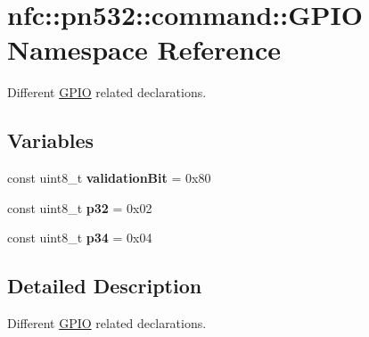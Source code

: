 \hypertarget{namespacenfc_1_1pn532_1_1command_1_1GPIO}{}\section{nfc\+:\+:pn532\+:\+:command\+:\+:G\+P\+IO Namespace Reference}
\label{namespacenfc_1_1pn532_1_1command_1_1GPIO}


Different \hyperlink{namespacenfc_1_1pn532_1_1command_1_1GPIO}{G\+P\+IO} related declarations.  


\subsection*{Variables}
\begin{DoxyCompactItemize}
\item 
\mbox{\label{namespacenfc_1_1pn532_1_1command_1_1GPIO_a6bcb3c35498d6509f17ae9c0a0848d50}} 
const uint8\+\_\+t {\bfseries validation\+Bit} = 0x80
\item 
\mbox{\label{namespacenfc_1_1pn532_1_1command_1_1GPIO_a5eeba6ca842e29f3f5525df9e4a506fb}} 
const uint8\+\_\+t {\bfseries p32} = 0x02
\item 
\mbox{\label{namespacenfc_1_1pn532_1_1command_1_1GPIO_a7e0133b87e9924e5d32899a2bb832c38}} 
const uint8\+\_\+t {\bfseries p34} = 0x04
\end{DoxyCompactItemize}


\subsection{Detailed Description}
Different \hyperlink{namespacenfc_1_1pn532_1_1command_1_1GPIO}{G\+P\+IO} related declarations. 